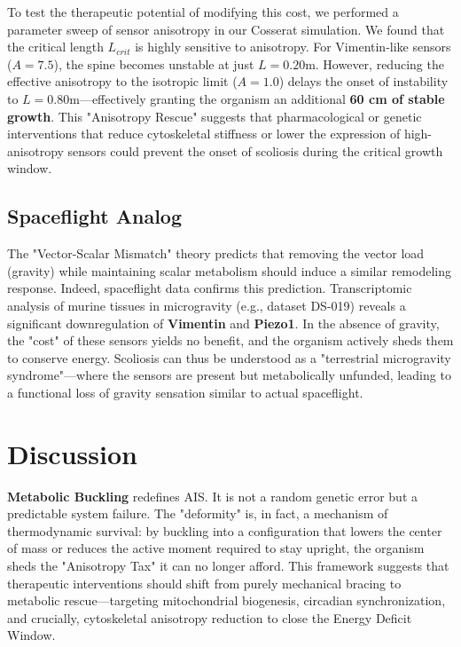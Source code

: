 \documentclass[11pt]{article}
\begin{document}
To test the therapeutic potential of modifying this cost, we performed a parameter sweep of sensor anisotropy in our Cosserat simulation. We found that the critical length $L_{crit}$ is highly sensitive to anisotropy. For Vimentin-like sensors ($A=7.5$), the spine becomes unstable at just $L=0.20$m. However, reducing the effective anisotropy to the isotropic limit ($A=1.0$) delays the onset of instability to $L=0.80$m—effectively granting the organism an additional \textbf{60 cm of stable growth}. This "Anisotropy Rescue" suggests that pharmacological or genetic interventions that reduce cytoskeletal stiffness or lower the expression of high-anisotropy sensors could prevent the onset of scoliosis during the critical growth window.

\subsection*{Spaceflight Analog}
The "Vector-Scalar Mismatch" theory predicts that removing the vector load (gravity) while maintaining scalar metabolism should induce a similar remodeling response. Indeed, spaceflight data confirms this prediction. Transcriptomic analysis of murine tissues in microgravity (e.g., dataset DS-019) reveals a significant downregulation of \textbf{Vimentin} and \textbf{Piezo1}\cite{rashidi2025piezo}. In the absence of gravity, the "cost" of these sensors yields no benefit, and the organism actively sheds them to conserve energy. Scoliosis can thus be understood as a "terrestrial microgravity syndrome"—where the sensors are present but metabolically unfunded, leading to a functional loss of gravity sensation similar to actual spaceflight.

\section*{Discussion}

\textbf{Metabolic Buckling} redefines AIS. It is not a random genetic error but a predictable system failure. The "deformity" is, in fact, a mechanism of thermodynamic survival: by buckling into a configuration that lowers the center of mass or reduces the active moment required to stay upright, the organism sheds the "Anisotropy Tax" it can no longer afford. This framework suggests that therapeutic interventions should shift from purely mechanical bracing to metabolic rescue—targeting mitochondrial biogenesis, circadian synchronization, and crucially, cytoskeletal anisotropy reduction to close the Energy Deficit Window.
\end{document}

